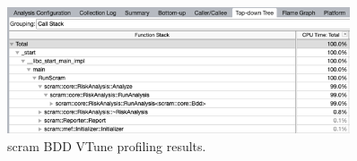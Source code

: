 \begin{figure}[H]
    \centering
    \includegraphics[width=0.9\textwidth]{3_identifying_gaps/benchmarking/profiling_methods/figures/vtune_scram_bdd.png}
    \caption{scram BDD VTune profiling results.}
    \label{fig:vtune_scram_bdd}
\end{figure}